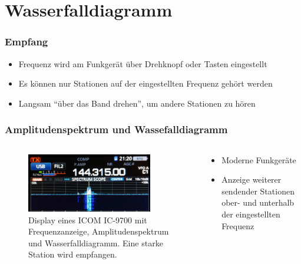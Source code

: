
\section{Wasserfalldiagramm}
\label{section:wasserfall}
\begin{frame}%

\frametitle{Empfang}
\begin{itemize}
  \item Frequenz wird am Funkgerät über Drehknopf oder Tasten eingestellt
  \item Es können nur Stationen auf der eingestellten Frequenz gehört werden
  \item Langsam \enquote{über das Band drehen}, um andere Stationen zu hören
  \end{itemize}
\end{frame}

\begin{frame}
\frametitle{Amplitudenspektrum und Wassefalldiagramm}
\begin{columns}
    \begin{column}{0.48\textwidth}
    
\begin{figure}
    \includegraphics[width=0.85\textwidth]{foto/95}
    \caption{\scriptsize Display eines ICOM IC-9700 mit Frequenzanzeige, Amplitudenspektrum und Wasserfalldiagramm. Eine starke Station wird empfangen.}
    \label{n_wasserfall_starke_station}
\end{figure}

    \end{column}
   \begin{column}{0.48\textwidth}
       \begin{itemize}
  \item Moderne Funkgeräte
  \item Anzeige weiterer sendender Stationen ober- und unterhalb der eingestellten Frequenz
  \end{itemize}

   \end{column}
\end{columns}

\end{frame}

